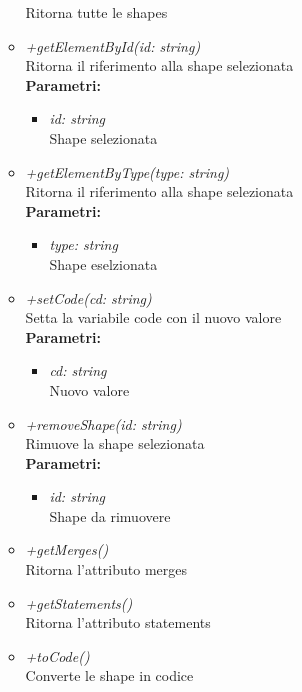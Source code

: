 \begin{itemize}
\begin{itemize}
    		Ritorna tutte le shapes
    		\item \emph{+getElementById(id: string)}\\
    		Ritorna il riferimento alla shape selezionata\\
    		\textbf{Parametri:}
    		\begin{itemize}
    			\item \emph{id: string}\\
    			Shape selezionata
    		\end{itemize}
    		\item \emph{+getElementByType(type: string)}\\
    		Ritorna il riferimento alla shape selezionata\\
    		\textbf{Parametri:}
    		\begin{itemize}
    			\item \emph{type: string}\\
    			Shape eselzionata
    		\end{itemize}
    		\item \emph{+setCode(cd: string)}\\
    		Setta la variabile code con il nuovo valore\\
    		\textbf{Parametri:}
    		\begin{itemize}
    			\item \emph{cd: string}\\
    			Nuovo valore
    		\end{itemize}
    		\item \emph{+removeShape(id: string)}\\
    		Rimuove la shape selezionata\\
    		\textbf{Parametri:}
    		\begin{itemize}
    			\item \emph{id: string}\\
    			Shape da rimuovere
    		\end{itemize}
    		\item \emph{+getMerges()}\\
    		Ritorna l'attributo merges
    		\item \emph{+getStatements()}\\
    		Ritorna l'attributo statements
    		\item \emph{+toCode()}\\
    		Converte le shape in codice
		\end{itemize}
\end{itemize}